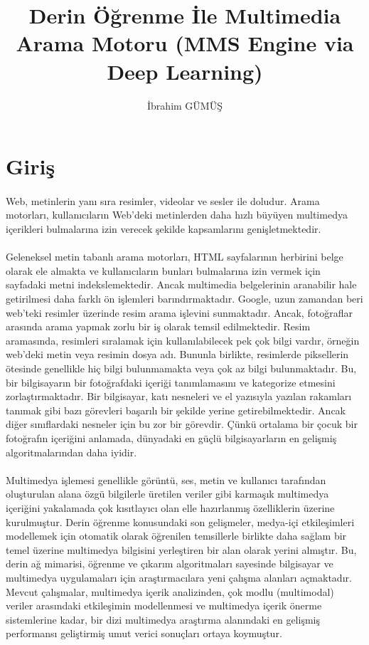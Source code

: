 \documentclass[11pt,a4paper]{article}
\title{Derin Öğrenme İle Multimedia Arama Motoru   (MMS Engine via Deep Learning)}
\author{İbrahim GÜMÜŞ}
\date{}
\begin{document}
\maketitle

\section{Giriş}
\paragraph{}
Web, metinlerin yanı sıra resimler, videolar ve sesler ile doludur. Arama motorları, kullanıcıların Web'deki metinlerden daha hızlı büyüyen multimedya içerikleri bulmalarına izin verecek şekilde kapsamlarını genişletmektedir.

\paragraph{}
Geleneksel metin tabanlı arama motorları, HTML sayfalarının herbirini belge olarak ele almakta ve kullanıcıların bunları bulmalarına izin vermek için sayfadaki metni indekslemektedir. Ancak multimedia belgelerinin aranabilir hale getirilmesi daha farklı ön işlemleri barındırmaktadır. Google, uzun zamandan beri web'teki resimler üzerinde resim arama işlevini sunmaktadır. Ancak, fotoğraflar arasında arama yapmak zorlu bir iş olarak temsil edilmektedir. Resim aramasında, resimleri sıralamak için kullanılabilecek pek çok bilgi vardır, örneğin web'deki metin veya resimin dosya adı. Bununla birlikte, resimlerde piksellerin ötesinde genellikle hiç bilgi bulunmamakta veya çok az bilgi bulunmaktadır. Bu, bir bilgisayarın bir fotoğrafdaki içeriği tanımlamasını ve kategorize etmesini zorlaştırmaktadır. Bir bilgisayar, katı nesneleri ve el yazısıyla yazılan rakamları tanımak gibi bazı görevleri başarılı bir şekilde yerine getirebilmektedir. Ancak diğer sınıflardaki nesneler için bu zor bir görevdir. Çünkü ortalama bir çocuk bir fotoğrafın içeriğini anlamada, dünyadaki en güçlü bilgisayarların en gelişmiş algoritmalarından daha iyidir.

\paragraph{}
Multimedya işlemesi genellikle görüntü, ses, metin ve kullanıcı tarafından oluşturulan alana özgü bilgilerle üretilen veriler gibi karmaşık multimedya içeriğini yakalamada çok kısıtlayıcı olan elle hazırlanmış özelliklerin üzerine kurulmuştur. Derin öğrenme konusundaki son gelişmeler, medya-içi etkileşimleri modellemek için otomatik olarak öğrenilen temsillerle birlikte daha sağlam bir temel üzerine multimedya bilgisini yerleştiren bir alan olarak yerini almıştır. Bu, derin ağ mimarisi, öğrenme ve çıkarım algoritmaları sayesinde bilgisayar ve multimedya uygulamaları için araştırmacılara yeni çalışma alanları açmaktadır. Mevcut çalışmalar, multimedya içerik analizinden, çok modlu (multimodal) veriler arasındaki etkileşimin modellenmesi ve multimedya içerik önerme sistemlerine kadar, bir dizi multimedya araştırma alanındaki en gelişmiş performansı geliştirmiş umut verici sonuçları ortaya koymuştur.
\end{document}
